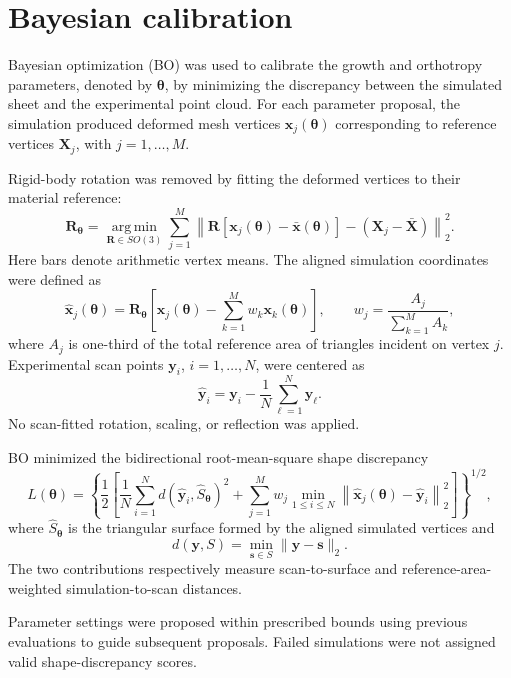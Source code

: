 \documentclass[11pt]{article}
\begin{document}
\section*{Bayesian calibration}
Bayesian optimization (BO) was used to calibrate the growth and orthotropy parameters, denoted by $\boldsymbol{\theta}$, by minimizing the discrepancy between the simulated sheet and the experimental point cloud. For each parameter proposal, the simulation produced deformed mesh vertices $\mathbf{x}_j(\boldsymbol{\theta})$ corresponding to reference vertices $\mathbf{X}_j$, with $j=1,\ldots,M$.

Rigid-body rotation was removed by fitting the deformed vertices to their material reference:
\begin{equation}
\mathbf{R}_{\boldsymbol{\theta}}=
\underset{\mathbf{R}\in SO(3)}{\operatorname{arg\,min}}
\sum_{j=1}^{M}\left\|
\mathbf{R}[\mathbf{x}_j(\boldsymbol{\theta})-\bar{\mathbf{x}}(\boldsymbol{\theta})]
-(\mathbf{X}_j-\bar{\mathbf{X}})\right\|_2^2.
\end{equation}
Here bars denote arithmetic vertex means. The aligned simulation coordinates were defined as
\begin{equation}
\widehat{\mathbf{x}}_j(\boldsymbol{\theta})=
\mathbf{R}_{\boldsymbol{\theta}}\left[\mathbf{x}_j(\boldsymbol{\theta})-
\sum_{k=1}^{M}w_k\mathbf{x}_k(\boldsymbol{\theta})\right],
\qquad w_j=\frac{A_j}{\sum_{k=1}^{M}A_k},
\end{equation}
where $A_j$ is one-third of the total reference area of triangles incident on vertex $j$. Experimental scan points $\mathbf{y}_i$, $i=1,\ldots,N$, were centered as
\begin{equation}
\widehat{\mathbf{y}}_i=\mathbf{y}_i-\frac{1}{N}\sum_{\ell=1}^{N}\mathbf{y}_{\ell}.
\end{equation}
No scan-fitted rotation, scaling, or reflection was applied.

BO minimized the bidirectional root-mean-square shape discrepancy
\begin{equation}
L(\boldsymbol{\theta})=
\left\{\frac{1}{2}\left[
\frac{1}{N}\sum_{i=1}^{N}d(\widehat{\mathbf{y}}_i,\widehat{S}_{\boldsymbol{\theta}})^2
+\sum_{j=1}^{M}w_j\min_{1\leq i\leq N}
\left\|\widehat{\mathbf{x}}_j(\boldsymbol{\theta})-\widehat{\mathbf{y}}_i\right\|_2^2
\right]\right\}^{1/2},
\end{equation}
where $\widehat{S}_{\boldsymbol{\theta}}$ is the triangular surface formed by the aligned simulated vertices and
\begin{equation}
d(\mathbf{y},S)=\min_{\mathbf{s}\in S}\|\mathbf{y}-\mathbf{s}\|_2.
\end{equation}
The two contributions respectively measure scan-to-surface and reference-area-weighted simulation-to-scan distances.

Parameter settings were proposed within prescribed bounds using previous evaluations to guide subsequent proposals. Failed simulations were not assigned valid shape-discrepancy scores.
\end{document}
